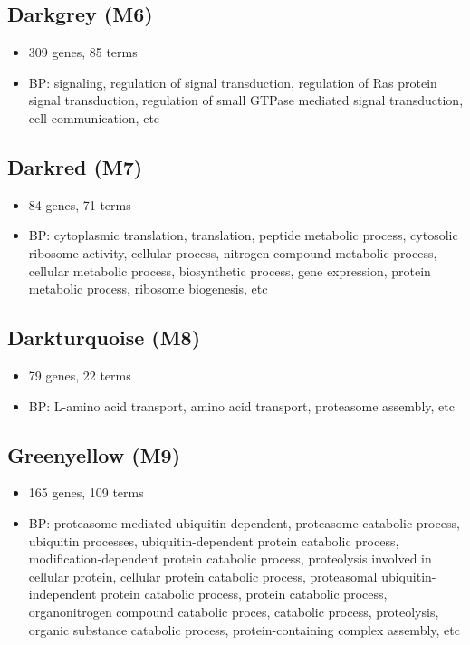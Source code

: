 \documentclass[]{article}
\providecommand{\tightlist}{%
  \setlength{\itemsep}{0pt}\setlength{\parskip}{0pt}}
\begin{document}
\hypertarget{darkgrey-m6}{%
\subsection{Darkgrey (M6)}\label{darkgrey-m6}}

\begin{itemize}
\tightlist
\item
  309 genes, 85 terms
\item
  BP: signaling, regulation of signal transduction, regulation of Ras
  protein signal transduction, regulation of small GTPase mediated
  signal transduction, cell communication, etc
\end{itemize}

\hypertarget{darkred-m7}{%
\subsection{Darkred (M7)}\label{darkred-m7}}

\begin{itemize}
\tightlist
\item
  84 genes, 71 terms
\item
  BP: cytoplasmic translation, translation, peptide metabolic process,
  cytosolic ribosome activity, cellular process, nitrogen compound
  metabolic process, cellular metabolic process, biosynthetic process,
  gene expression, protein metabolic process, ribosome biogenesis, etc
\end{itemize}

\hypertarget{darkturquoise-m8}{%
\subsection{Darkturquoise (M8)}\label{darkturquoise-m8}}

\begin{itemize}
\tightlist
\item
  79 genes, 22 terms
\item
  BP: L-amino acid transport, amino acid transport, proteasome assembly,
  etc
\end{itemize}

\hypertarget{greenyellow-m9}{%
\subsection{Greenyellow (M9)}\label{greenyellow-m9}}

\begin{itemize}
\tightlist
\item
  165 genes, 109 terms
\item
  BP: proteasome-mediated ubiquitin-dependent, proteasome catabolic
  process, ubiquitin processes, ubiquitin-dependent protein catabolic
  process, modification-dependent protein catabolic process, proteolysis
  involved in cellular protein, cellular protein catabolic process,
  proteasomal ubiquitin-independent protein catabolic process, protein
  catabolic process, organonitrogen compound catabolic proces, catabolic
  process, proteolysis, organic substance catabolic process,
  protein-containing complex assembly, etc
\end{itemize}
\end{document}
